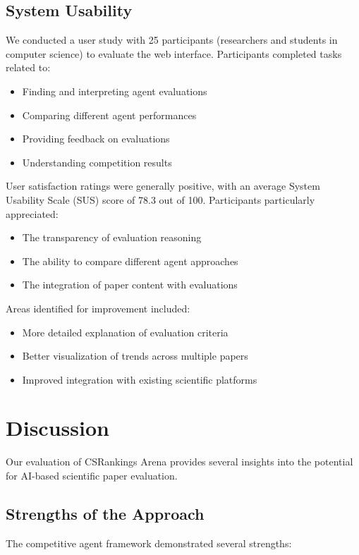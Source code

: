 \documentclass[conference]{IEEEtran}
\begin{document}
\subsection{System Usability}
We conducted a user study with 25 participants (researchers and students in computer science) to evaluate the web interface. Participants completed tasks related to:

\begin{itemize}
    \item Finding and interpreting agent evaluations
    \item Comparing different agent performances
    \item Providing feedback on evaluations
    \item Understanding competition results
\end{itemize}

User satisfaction ratings were generally positive, with an average System Usability Scale (SUS) score of 78.3 out of 100. Participants particularly appreciated:

\begin{itemize}
    \item The transparency of evaluation reasoning
    \item The ability to compare different agent approaches
    \item The integration of paper content with evaluations
\end{itemize}

Areas identified for improvement included:
\begin{itemize}
    \item More detailed explanation of evaluation criteria
    \item Better visualization of trends across multiple papers
    \item Improved integration with existing scientific platforms
\end{itemize}

\section{Discussion}
Our evaluation of CSRankings Arena provides several insights into the potential for AI-based scientific paper evaluation.

\subsection{Strengths of the Approach}
The competitive agent framework demonstrated several strengths:
\end{document}
